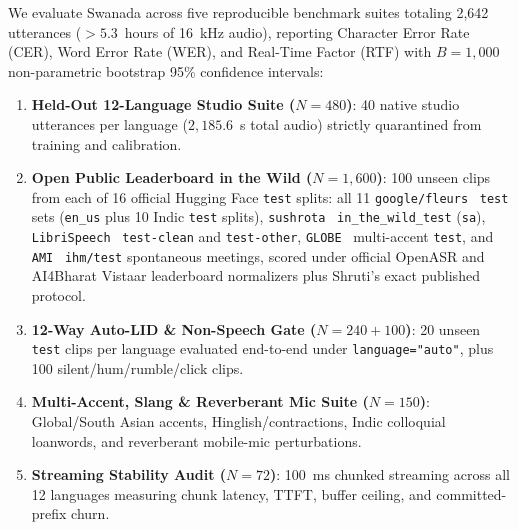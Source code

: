\documentclass[10pt,twocolumn]{article}
\begin{document}
We evaluate Swanada across five reproducible benchmark suites totaling 2,642 utterances ($> 5.3$~hours of 16~kHz audio), reporting Character Error Rate (CER), Word Error Rate (WER), and Real-Time Factor (RTF) with $B = 1{,}000$ non-parametric bootstrap 95\% confidence intervals:
\begin{enumerate}\setlength{\itemsep}{1pt}\setlength{\parskip}{0pt}
    \item \textbf{Held-Out 12-Language Studio Suite ($N = 480$)}: 40 native studio utterances per language ($2{,}185.6$~s total audio) strictly quarantined from training and calibration.
    \item \textbf{Open Public Leaderboard in the Wild ($N = 1{,}600$)}: 100 unseen clips from each of 16 official Hugging Face \texttt{test} splits: all 11 \texttt{google/fleurs}~\cite{conneau2023fleurs} \texttt{test} sets (\texttt{en\_us} plus 10 Indic \texttt{test} splits), \texttt{sushrota}~\cite{adiga2021sanskrit} \texttt{in\_the\_wild\_test} (\texttt{sa}), \texttt{LibriSpeech}~\cite{panayotov2015librispeech} \texttt{test-clean} and \texttt{test-other}, \texttt{GLOBE}~\cite{wang2024globe} multi-accent \texttt{test}, and \texttt{AMI}~\cite{carletta2005ami} \texttt{ihm/test} spontaneous meetings, scored under official OpenASR and AI4Bharat Vistaar leaderboard normalizers plus Shruti's exact published protocol.
    \item \textbf{12-Way Auto-LID \& Non-Speech Gate ($N = 240 + 100$)}: 20 unseen \texttt{test} clips per language evaluated end-to-end under \texttt{language="auto"}, plus 100 silent/hum/rumble/click clips.
    \item \textbf{Multi-Accent, Slang \& Reverberant Mic Suite ($N = 150$)}: Global/South Asian accents, Hinglish/contractions, Indic colloquial loanwords, and reverberant mobile-mic perturbations.
    \item \textbf{Streaming Stability Audit ($N = 72$)}: 100~ms chunked streaming across all 12 languages measuring chunk latency, TTFT, buffer ceiling, and committed-prefix churn.
\end{enumerate}
\end{document}
